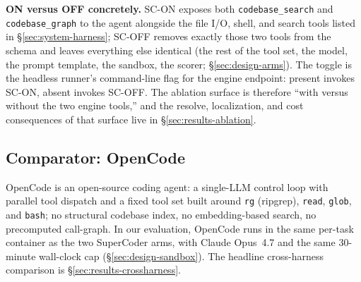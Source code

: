 \textbf{ON versus OFF concretely.} SC-ON exposes both
\texttt{codebase\_search} and \texttt{codebase\_graph} to the agent alongside
the file I/O, shell, and search tools listed in \S\ref{sec:system-harness};
SC-OFF removes exactly those two tools from the schema and leaves everything
else identical (the rest of the tool set, the model, the prompt template, the
sandbox, the scorer; \S\ref{sec:design-arms}). The toggle is the headless
runner's command-line flag for the engine endpoint: present invokes SC-ON,
absent invokes SC-OFF. The ablation surface is therefore ``with versus without
the two engine tools,'' and the resolve, localization, and cost consequences of
that surface live in \S\ref{sec:results-ablation}.

\subsection{Comparator: OpenCode}
\label{sec:system-opencode}

OpenCode \citep{opencode2025} is an open-source coding agent: a single-LLM control loop with parallel tool dispatch and a fixed tool set built around \texttt{rg} (ripgrep), \texttt{read}, \texttt{glob}, and \texttt{bash}; no structural codebase index, no embedding-based search, no precomputed call-graph. In our evaluation, OpenCode runs in the same per-task container as the two SuperCoder arms, with Claude Opus~4.7 and the same 30-minute wall-clock cap (\S\ref{sec:design-sandbox}). The headline cross-harness comparison is \S\ref{sec:results-crossharness}.
\FloatBarrier
